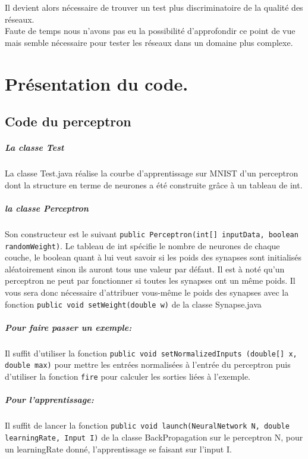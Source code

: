 \documentclass[a4paper,oneside]{report}
\begin{document}
  Il devient alors nécessaire de trouver un test plus discriminatoire de la qualité des 
réseaux.\\

 Faute de temps nous n'avons pas eu la possibilité d'approfondir ce point de vue mais 
semble nécessaire pour tester les réseaux dans un domaine plus complexe.

        \chapter{Présentation du code.}
        
\section{Code du perceptron}

\paragraph*{La classe Test} La classe Test.java réalise la courbe d'apprentissage sur MNIST d'un perceptron dont la structure en terme de neurones a été construite grâce à un tableau de int.

\paragraph*{la classe Perceptron} 
Son constructeur est le suivant \texttt{public Perceptron(int[] inputData, boolean randomWeight)}. Le tableau de int spécifie le nombre de neurones de chaque couche, le boolean quant à lui veut savoir si les poids des synapses sont initialisés aléatoirement sinon ils auront tous une valeur par défaut. Il est à noté qu'un perceptron ne peut par fonctionner si toutes les synapses ont un même poids. Il vous sera donc nécessaire d'attribuer vous-même le poids des synapses avec la fonction \texttt{public void setWeight(double w)} de la classe Synapse.java

\paragraph*{Pour faire passer un exemple:} Il suffit d'utiliser la fonction \texttt{public void setNormalizedInputs (double[] x, double max)} pour mettre les entrées normalisées à l'entrée du perceptron puis d'utiliser la fonction \texttt{fire} pour calculer les sorties liées à l'exemple.

\paragraph*{Pour l'apprentissage: } Il suffit de lancer la fonction \texttt{public void launch(NeuralNetwork N, double learningRate, Input I)} de la classe BackPropagation sur le perceptron N, pour un learningRate donné, l'apprentissage se faisant sur l'input I.  
\end{document}
